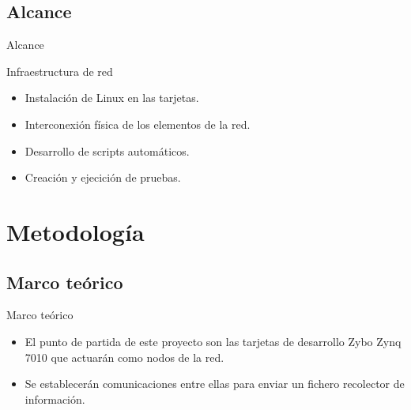 \documentclass[aspectratio=169]{beamer}
\begin{document}
\subsection{Alcance}
\begin{frame}{Alcance}
\begin{block}{Infraestructura de red}
	\begin{itemize}
		\item Instalación de Linux en las tarjetas.
		\item Interconexión física de los elementos de la red.
		\item Desarrollo de scripts automáticos.
		\item Creación y ejecición de pruebas.
	\end{itemize}
\end{block}
\end{frame}

\section{Metodología}
\subsection{Marco teórico}
\begin{frame}{Marco teórico}
\begin{itemize}
	\item El punto de partida de este proyecto son las tarjetas de desarrollo Zybo Zynq 7010 que actuarán como nodos de la red.
	\item Se establecerán comunicaciones entre ellas para enviar un fichero recolector de información.
\end{itemize}
\end{frame}
\end{document}
